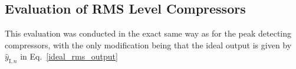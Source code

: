 \documentclass[../main2.tex]{subfiles}
\begin{document}
\subsection{Evaluation of RMS Level Compressors}\label{method_rms_compressors}
This evaluation was conducted in the exact same way as for the peak detecting compressors, with the only modification being that the ideal output is given by $\hat{y}_{\text{I},n}$ in Eq.~\eqref{ideal_rms_output}
\end{document}
